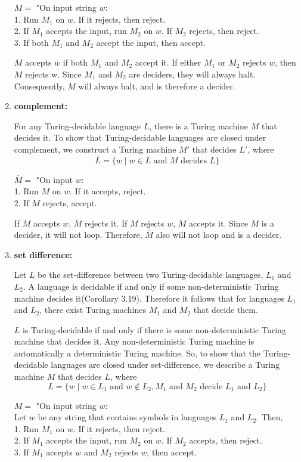 \documentclass{article}
\begin{document}
\begin{enumerate}[\indent a)]
$M = $ "On input string $w$: 
    \\1. Run $M_1$ on $w$. If it rejects, then reject.
    \\2. If $M_1$ accepts the input, run $M_2$ on $w$. If $M_2$ rejects, then reject.
    \\3. If both $M_1$ and $M_2$ accept the input, then accept.
    
    
    $M$ accepts $w$ if both $M_1$ and $M_2$ accept it. If either $M_1$ or $M_2$ rejects $w$, then $M$ rejects w. Since $M_1$ and $M_2$ are deciders, they will always halt. Consequently, $M$ will always halt, and is therefore a decider.
    
    \item \textbf{complement:}
    
    For any Turing-decidable language $L$, there is a Turing machine $M$ that decides it. To show that Turing-decidable languages are closed under complement, we construct a Turing machine $M'$ that decides $L'$, where
    $$\overline{L} = \{w \;|\;  w \in \overline{L} \text{ and $M$ decides $L$}  \}$$
    
    $\overline{M} = $ "On input $w$:
    \\1. Run $M$ on $w$. If it accepts, reject.
    \\2. If $M$ rejects, accept.
    
    
    If $M$ accepts $w$, $\overline{M}$ rejects it. If $M$ rejects $w$, $\overline{M}$ accepts it. Since $M$ is a decider, it will not loop. Therefore, $\overline{M}$ also will not loop and is a decider.
    \item \textbf{set difference:}
    
        Let $L$ be the set-difference between two Turing-decidable languages, $L_1$ and $L_2$. A language is decidable if and only if some non-deterministic Turing machine decides it(Corollary 3.19). Therefore it follows that for languages $L_1$ and $L_2$, there exist Turing machines $M_1$ and $M_2$ that decide them.

$L$ is Turing-decidable if and only if there is some non-deterministic Turing machine that decides it. Any non-deterministic Turing machine is automatically a deterministic Turing machine. So, to show that the Turing-decidable languages are closed under set-difference, we describe a Turing machine $M$ that decides $L$, where
$$L = \{w \;|\;  w \in L_1 \text{ and } w\notin L_2, M_1 \text{ and  $M_2$ decide $L_1$ and $L_2$}\}$$

$M = $ "On input string $w$: 
    \\Let $w$ be any string that contains symbols in languages $L_1$ and $L_2$. Then,
    \\1. Run $M_1$ on $w$. If it rejects, then reject.
    \\2. If $M_1$ accepts the input, run $M_2$ on $w$. If $M_2$ accepts, then reject.
    \\3. If $M_1$ accepts $w$ and $M_2$ rejects $w$, then accept.
    

\end{enumerate}
\end{document}
